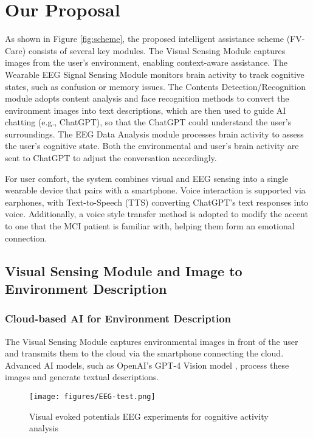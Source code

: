 \documentclass[conference]{IEEEtran}
\begin{document}
\section{Our Proposal} \label{sec: method}

As shown in Figure \ref{fig:scheme}, the proposed intelligent assistance scheme (FV-Care) consists of several key modules. The Visual Sensing Module captures images from the user’s environment, enabling context-aware assistance. The Wearable EEG Signal Sensing Module monitors brain activity to track cognitive states, such as confusion or memory issues. The Contents Detection/Recognition module adopts content analysis and face recognition methods to convert the environment images into text descriptions, which are then used to guide AI chatting (e.g., ChatGPT), so that the ChatGPT could understand the user’s surroundings. The EEG Data Analysis module processes brain activity to assess the user’s cognitive state. Both the environmental and user's brain activity are sent to ChatGPT to adjust the conversation accordingly.

For user comfort, the system combines visual and EEG sensing into a single wearable device that pairs with a smartphone. Voice interaction is supported via earphones, with Text-to-Speech (TTS) converting ChatGPT’s text responses into voice. Additionally, a voice style transfer method is adopted to modify the accent to one that the MCI patient is familiar with, helping them form an emotional connection. 



\subsection{Visual Sensing Module and Image to Environment Description}

\subsubsection{Cloud-based AI for Environment Description}
The Visual Sensing Module captures environmental images in front of the user and transmits them to the cloud via the smartphone connecting the cloud. Advanced AI models, such as OpenAI's GPT-4 Vision model \cite{jiayev2024gpt4v}, process these images and generate textual descriptions. 

\begin{figure}[!t]
    \centering    \texttt{[image: figures/EEG-test.png]}%
    \caption{ Visual evoked potentials EEG experiments for cognitive activity analysis  }
   \label{fig:EEG-test}
   \vspace{-0.5cm}
\end{figure}
\end{document}
